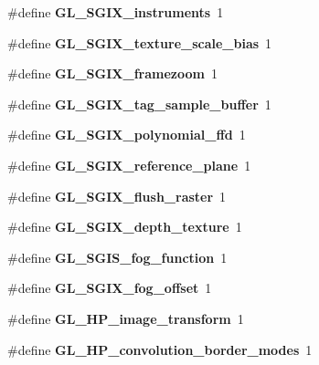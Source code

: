 \begin{DoxyCompactItemize}
\item 
\#define {\bfseries G\+L\+\_\+\+S\+G\+I\+X\+\_\+instruments}~1\label{_s_d_l__opengl_8h_a6c492545e68f89d1a655da2f25fc1a15}

\item 
\#define {\bfseries G\+L\+\_\+\+S\+G\+I\+X\+\_\+texture\+\_\+scale\+\_\+bias}~1\label{_s_d_l__opengl_8h_a6ab170067597f1fe8ee16649dc100452}

\item 
\#define {\bfseries G\+L\+\_\+\+S\+G\+I\+X\+\_\+framezoom}~1\label{_s_d_l__opengl_8h_aac6dcb4154be96f48131784261d4f3c1}

\item 
\#define {\bfseries G\+L\+\_\+\+S\+G\+I\+X\+\_\+tag\+\_\+sample\+\_\+buffer}~1\label{_s_d_l__opengl_8h_afe89cabd3343add1d340bed842ef255f}

\item 
\#define {\bfseries G\+L\+\_\+\+S\+G\+I\+X\+\_\+polynomial\+\_\+ffd}~1\label{_s_d_l__opengl_8h_a2a7432704a52d3aca037c4a909af923e}

\item 
\#define {\bfseries G\+L\+\_\+\+S\+G\+I\+X\+\_\+reference\+\_\+plane}~1\label{_s_d_l__opengl_8h_ac56c2443f339b2fb3615043ce8d4bc4e}

\item 
\#define {\bfseries G\+L\+\_\+\+S\+G\+I\+X\+\_\+flush\+\_\+raster}~1\label{_s_d_l__opengl_8h_a4e2b7ca2a7e3a834f994767bd9cea366}

\item 
\#define {\bfseries G\+L\+\_\+\+S\+G\+I\+X\+\_\+depth\+\_\+texture}~1\label{_s_d_l__opengl_8h_a88c73528ba800bff6d9640ef6bc63832}

\item 
\#define {\bfseries G\+L\+\_\+\+S\+G\+I\+S\+\_\+fog\+\_\+function}~1\label{_s_d_l__opengl_8h_a2946015cf2402168a1c55f673052cafe}

\item 
\#define {\bfseries G\+L\+\_\+\+S\+G\+I\+X\+\_\+fog\+\_\+offset}~1\label{_s_d_l__opengl_8h_ab2639e4d2739a6bdc4a24730f70abfa4}

\item 
\#define {\bfseries G\+L\+\_\+\+H\+P\+\_\+image\+\_\+transform}~1\label{_s_d_l__opengl_8h_a70001ecf57693a3c43dd6944ecdec031}

\item 
\#define {\bfseries G\+L\+\_\+\+H\+P\+\_\+convolution\+\_\+border\+\_\+modes}~1\label{_s_d_l__opengl_8h_a67b10e3533683a9081f0116b0d34cd9a}


\end{DoxyCompactItemize}
